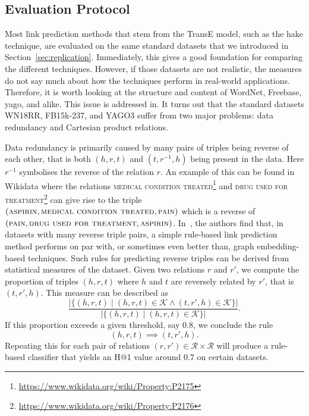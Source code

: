 \subsection{Evaluation Protocol}

Most link prediction methods that stem from the TransE model\cite{Bordes2013}, such as the \ac{hake} technique, are evaluated on the same standard datasets that we introduced in Section~\ref{sec:replication}.
Immediately, this gives a good foundation for comparing the different techniques.
However, if those datasets are not realistic, the measures do not say much about how the techniques perform in real-world applications.
Therefore, it is worth looking at the structure and content of WordNet, Freebase, \ac{yago}, and alike.
This issue is addressed in\cite{Akrami2020}.
It turns out that the standard datasets WN18RR, FB15k-237, and YAGO3 suffer from two major problems: data redundancy and Cartesian product relations.

Data redundancy is primarily caused by many pairs of triples being reverse of each other, that is both $(h, r, t)$ and $(t, r^{-1}, h)$ being present in the data.
Here $r^{-1}$ symbolises the reverse of the relation $r$.
An example of this can be found in Wikidata where the relations \textsc{medical condition treated}\footnote{\url{https://www.wikidata.org/wiki/Property:P2175}} and \textsc{drug used for treatment}\footnote{\url{https://www.wikidata.org/wiki/Property:P2176}} can give rise to the triple $(\textsc{aspirin}, \textsc{medical condition treated}, \textsc{pain})$ which is a reverse of $(\textsc{pain}, \textsc{drug used for treatment}, \textsc{aspirin})$.
In~\cite{Akrami2020}, the authors find that, in datasets with many reverse triple pairs, a simple rule-based link prediction method performs on par with, or sometimes even better than, graph embedding-based techniques.
Such rules for predicting reverse triples can be derived from statistical measures of the dataset\cite{Dettmers2017}.
Given two relations $r$ and $r'$, we compute the proportion of triples $(h, r, t)$ where $h$ and $t$ are reversely related by $r'$, that is $(t, r', h)$.
This measure can be described as
\[\frac{|\{(h, r, t) \mid (h, r, t) \in \mathcal{K} \wedge (t, r', h) \in \mathcal{K}\}|}{|\{(h, r, t) \mid (h, r, t) \in \mathcal{K}\}|}.\]
If this proportion exceeds a given threshold, say $0.8$, we conclude the rule
\[(h, r, t) \implies (t, r', h).\]
Repeating this for each pair of relations $(r, r') \in \mathcal{R} \times \mathcal{R}$ will produce a rule-based classifier that yields an H@1 value around $0.7$ on certain datasets\cite{Akrami2020}.

